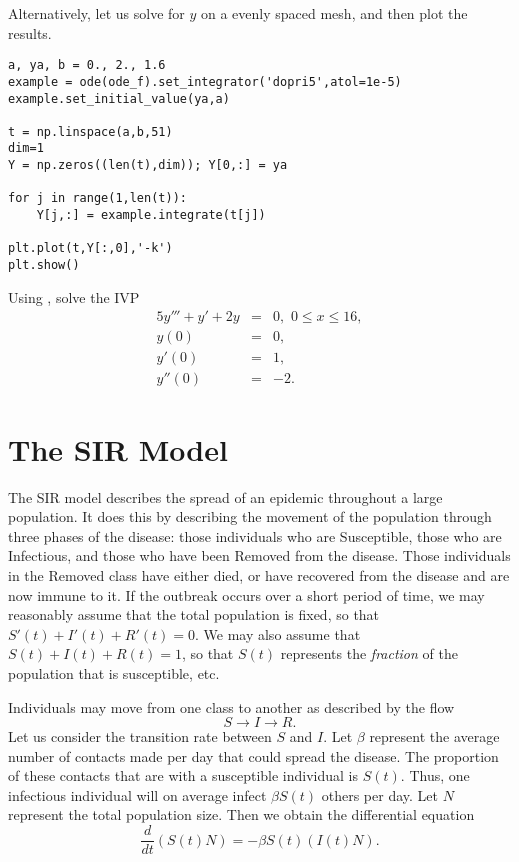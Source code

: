 Alternatively, let us solve for $y$ on a evenly spaced mesh, and then plot the results.
\begin{lstlisting}
a, ya, b = 0., 2., 1.6
example = ode(ode_f).set_integrator('dopri5',atol=1e-5) 
example.set_initial_value(ya,a) 

t = np.linspace(a,b,51)
dim=1
Y = np.zeros((len(t),dim)); Y[0,:] = ya

for j in range(1,len(t)): 
	Y[j,:] = example.integrate(t[j])  

plt.plot(t,Y[:,0],'-k')
plt.show()

\end{lstlisting}


\begin{problem}
Using , solve the IVP
\begin{eqnarray*}
5y''' + y'+2y &=& 0, \,\, 0 \leq x \leq 16,\\
y(0) &=&0,\\
y'(0) &=& 1,\\
y''(0) &=& -2.
\end{eqnarray*}
\end{problem}




\section*{The SIR Model}
The SIR model describes the spread of an epidemic throughout a large population. It does this by describing the movement of the population through three phases of the disease: those individuals who are Susceptible, those who are Infectious, and those who have been Removed from the disease. Those individuals in the Removed class have either died, or have recovered from the disease and are now immune to it. If the outbreak occurs over a short period of time, we may reasonably assume that the total population is fixed, so that $S'(t) + I'(t) + R'(t) = 0$.  We may also assume that $S(t) + I(t) + R(t) = 1$, so that $S(t)$ represents the \textit{fraction} of the population that is susceptible, etc. 

Individuals may move from one class to another as described by the flow 
\[S \to I \to R.\] Let us consider the transition rate between $S$ and $I $. Let $\beta$ represent the average number of contacts made per day that could spread the disease. The proportion of these contacts that are with a susceptible individual is $S(t)$. Thus, one infectious individual will on average infect $\beta S(t)$ others per day. Let $N$ represent the total population size. Then we obtain the differential equation
 \[\frac{d}{dt}(S(t) N) = -\beta S(t) (I(t) N).\]
 
